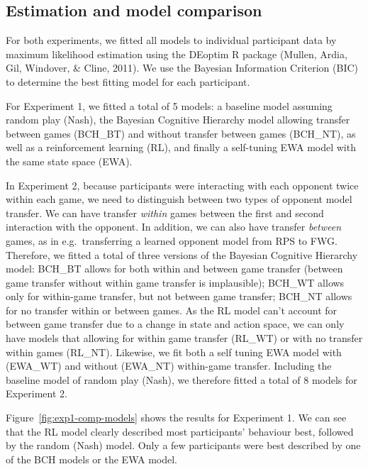 \documentclass[
  english,
  man,floatsintext]{apa6}
\begin{document}
\hypertarget{estimation-and-model-comparison}{%
\subsection{Estimation and model comparison}\label{estimation-and-model-comparison}}

For both experiments, we fitted all models to individual participant data by maximum likelihood estimation using the DEoptim R package (Mullen, Ardia, Gil, Windover, \& Cline, 2011). We use the Bayesian Information Criterion (BIC) to determine the best fitting model for each participant.

For Experiment 1, we fitted a total of 5 models: a baseline model assuming random play (Nash), the Bayesian Cognitive Hierarchy model allowing transfer between games (BCH\_BT) and without transfer between games (BCH\_NT), as well as a reinforcement learning (RL), and finally a self-tuning EWA model with the same state space (EWA).

In Experiment 2, because participants were interacting with each opponent twice within each game, we need to distinguish between two types of opponent model transfer. We can have transfer \emph{within} games between the first and second interaction with the opponent. In addition, we can also have transfer \emph{between} games, as in e.g.~transferring a learned opponent model from RPS to FWG. Therefore, we fitted a total of three versions of the Bayesian Cognitive Hierarchy model: BCH\_BT allows for both within and between game transfer (between game transfer without within game transfer is implausible); BCH\_WT allows only for within-game transfer, but not between game transfer; BCH\_NT allows for no transfer within or between games. As the RL model can't account for between game transfer due to a change in state and action space, we can only have models that allowing for within game transfer (RL\_WT) or with no transfer within games (RL\_NT). Likewise, we fit both a self tuning EWA model with (EWA\_WT) and without (EWA\_NT) within-game transfer. Including the baseline model of random play (Nash), we therefore fitted a total of 8 models for Experiment 2.

Figure~\ref{fig:exp1-comp-models} shows the results for Experiment 1. We can see that the RL model clearly described most participants' behaviour best, followed by the random (Nash) model. Only a few participants were best described by one of the BCH models or the EWA model.
\end{document}
